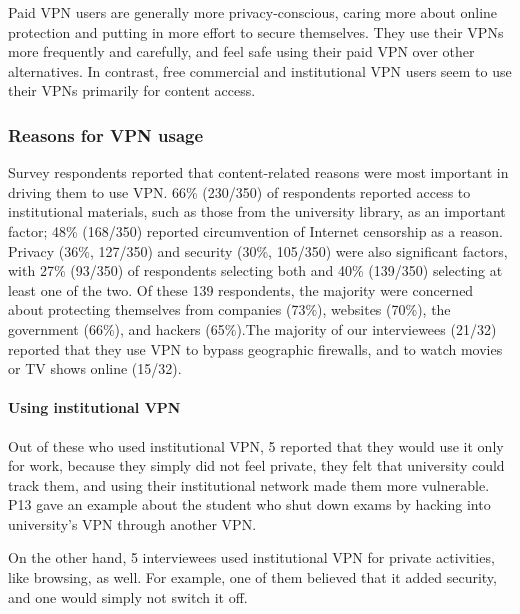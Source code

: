 Paid VPN users are generally more privacy-conscious, caring more about online
protection and putting in more effort to secure themselves. They use their
VPNs more frequently and carefully, and feel safe using their paid VPN over
other alternatives. In contrast, free commercial and institutional VPN users
seem to use their VPNs primarily for content access.





\subsubsection{Reasons for VPN usage}
Survey respondents reported that content-related reasons were most important
in driving them to use VPN. 66\% (230/350) of respondents reported access to
institutional materials, such as those from the university library, as an
important factor; 48\% (168/350) reported circumvention of Internet censorship
as a reason. Privacy (36\%, 127/350) and security (30\%, 105/350) were also
significant factors, with 27\% (93/350) of respondents selecting both and 40\%
(139/350) selecting at least one of the two. Of these 139 respondents, the
majority were concerned about protecting themselves from companies (73\%),
websites (70\%), the government (66\%), and hackers (65\%).The majority of our interviewees (21/32) reported
that they use VPN to bypass geographic firewalls, and to watch movies
or TV shows online (15/32).  

\paragraph{Using institutional VPN} Out of these who used institutional
VPN, 5 reported that they would use it only for work, because they simply did
not feel private, they felt that university could track them, and using their
institutional network made them more vulnerable. P13 gave an example about the
student who shut down exams by hacking into university's VPN through another
VPN. %

On the other hand, 5 interviewees used institutional VPN for private
activities, like browsing, as well. For example, one of them believed that it
added security, and one would simply not switch it off. 

